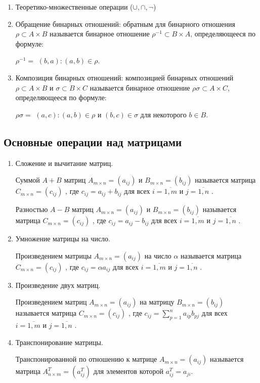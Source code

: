 \documentclass[spec, och, labwork]{shiza}
\begin{document}
    \begin{enumerate}
        \item Теоретико-множественные операции ($\cup, \cap, \neg$)
        \item Обращение бинарных отношений: обратным для бинарного отношения $\rho \subset A \times B$ называется бинарное
        отношение $\rho^{-1} \subset B \times A$, определяющееся по формуле:
        \begin{center}
            $\rho^{-1} = $ {$(b, a) : (a, b) \in \rho$}.
        \end{center}
        \item Композиция бинарных отношений: композицией бинарных отношений $\rho \subset A \times B$ и $\sigma \subset B \times C$
        называется бинарное отношение $\rho\sigma \subset A \times C$, определяющееся по формуле:
        \begin{center}
            $\rho\sigma = $ {$(a, c) : (a, b) \in \rho \text{ и } (b, c) \in \sigma \text{ для некоторого } b \in B$}.
        \end{center}
    \end{enumerate}

    \subsection{Основные операции над матрицами}

    \begin{enumerate}
        \item Сложение и вычитание матриц.
        
        Суммой $A + B$ матриц $A_{m \times n} = (a_{ij}) \text{ и }B_{m \times n} = (b_{ij})$ называется матрица 
        $C_{m \times n} = (c_{ij})$ , где $c_{ij} = a_{ij} + b_{ij}$ для всех $i = \overline{1, m} \text{ и } j = \overline{1, n}$ .

        Разностью $A - B$ матриц $A_{m \times n} = (a_{ij}) \text{ и }B_{m \times n} = (b_{ij})$ называется матрица 
        $C_{m \times n} = (c_{ij})$ , где $c_{ij} = a_{ij} - b_{ij}$ для всех $i = \overline{1, m} \text{ и } j = \overline{1, n}$ .
        \item Умножение матрицы на число.
        
        Произведением матрицы $A_{m \times n} = (a_{ij}) \text{ на число } \alpha$ называется матрица 
        $C_{m \times n} = (c_{ij})$ , где $c_{ij} = \alpha a_{ij}$ для всех $i = \overline{1, m} \text{ и } j = \overline{1, n}$ .
        \item Произведение двух матриц.
        
        Произведением матриц $A_{m \times n} = (a_{ij}) \text{ на матрицу }B_{m \times n} = (b_{ij})$ называется матрица 
        $C_{m \times n} = (c_{ij})$ , где $c_{ij} = \sum\limits_{p=1}^n a_{ip}b_{pj}$ для всех $i = \overline{1, m} \text{ и } j = \overline{1, n}$ .
        \item Транспонирование матрицы.
        
        Транспонированной по отношению к матрице $A_{m \times n} = (a_{ij})$ называется матрица $A^T_{n \times m} = (a^T_{ij})$
        для элементов которой $a^T_{ij} = a_{ji}$.
    \end{enumerate}
\end{document}
